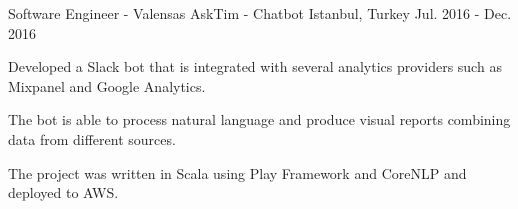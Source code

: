 \begin{cventries}
  \cventry
    {Software Engineer - Valensas}
    {AskTim - Chatbot}
    {Istanbul, Turkey}
    {Jul. 2016 - Dec. 2016}
    {
      \begin{cvitems}
        \item {Developed a Slack bot that is integrated with several analytics providers such as Mixpanel and Google Analytics.}
        \item {The bot is able to process natural language and produce visual reports combining data from different sources.}
        \item {The project was written in Scala using Play Framework and CoreNLP and deployed to AWS.}
      \end{cvitems}
    }    
    
\end{cventries}

